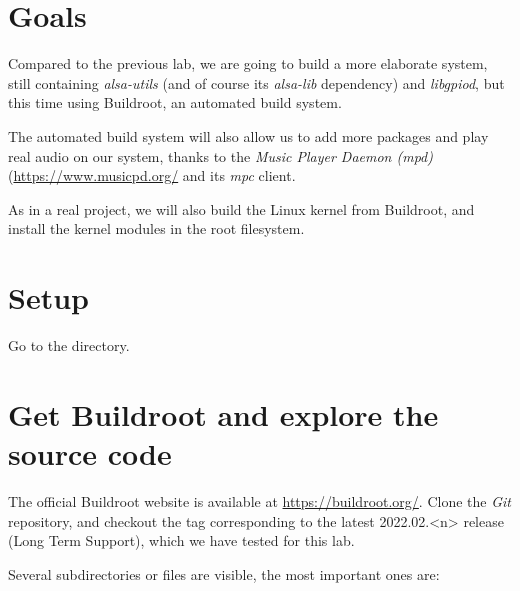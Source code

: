 
\section{Goals}

Compared to the previous lab, we are going to build a more elaborate
system, still containing {\em alsa-utils} (and of course its {\em
alsa-lib} dependency) and {\em libgpiod}, but this time using Buildroot,
an automated build system.

The automated build system will also allow us to add more packages
and play real audio on our system, thanks to the {\em Music Player
Daemon (mpd)} (\url{https://www.musicpd.org/} and its {\em mpc} client.

As in a real project, we will also build the Linux kernel from
Buildroot, and install the kernel modules in the root filesystem.

\section{Setup}

Go to the  directory.

\section{Get Buildroot and explore the source code}

The official Buildroot website is available at
\url{https://buildroot.org/}. Clone the {\em Git} repository, and
checkout the tag corresponding to the latest 2022.02.<n> release (Long
Term Support), which we have tested for this lab.

Several subdirectories or files are visible, the most important ones
are:

